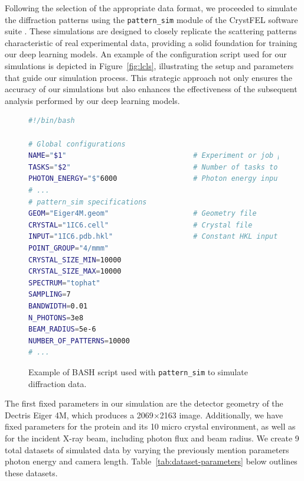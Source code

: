 \documentclass[12pt]{article}
\begin{document}
Following the selection of the appropriate data format, we proceeded to simulate the diffraction patterns using the \texttt{pattern\_sim} module of the CrystFEL software suite \cite{crystfel_patternsim}. These simulations are designed to closely replicate the scattering patterns characteristic of real experimental data, providing a solid foundation for training our deep learning models. An example of the configuration script used for our simulations is depicted in Figure~\ref{fig:lcls}, illustrating the setup and parameters that guide our simulation process. This strategic approach not only ensures the accuracy of our simulations but also enhances the effectiveness of the subsequent analysis performed by our deep learning models.

\begin{figure}[H]
\centering
\begin{lstlisting}[language=bash]
#!/bin/bash

# Global configurations
NAME="$1"                              # Experiment or job prefix
TASKS="$2"                             # Number of tasks to request for each job
PHOTON_ENERGY="$"6000                  # Photon energy input
# ...
# pattern_sim specifications
GEOM="Eiger4M.geom"                    # Geometry file
CRYSTAL="1IC6.cell"                    # Crystal file
INPUT="1IC6.pdb.hkl"                   # Constant HKL input file
POINT_GROUP="4/mmm"
CRYSTAL_SIZE_MIN=10000
CRYSTAL_SIZE_MAX=10000
SPECTRUM="tophat"
SAMPLING=7
BANDWIDTH=0.01
N_PHOTONS=3e8
BEAM_RADIUS=5e-6
NUMBER_OF_PATTERNS=10000
# ...
\end{lstlisting}
\caption{Example of BASH script used with \texttt{pattern\_sim} \cite{crystfel_patternsim} to simulate diffraction data.}
\label{fig:bashSubmitionExample}
\end{figure}

The first fixed parameters in our simulation are the detector geometry of the Dectris Eiger 4M, which produces a 2069$\times$2163 image. Additionally, we have fixed parameters for the protein and its 10 micro crystal environment, as well as for the incident X-ray beam, including photon flux and beam radius. We create 9 total datasets of simulated data by varying the previously mention parameters photon energy and camera length. Table~\ref{tab:dataset-parameters} below outlines these datasets.
\end{document}
